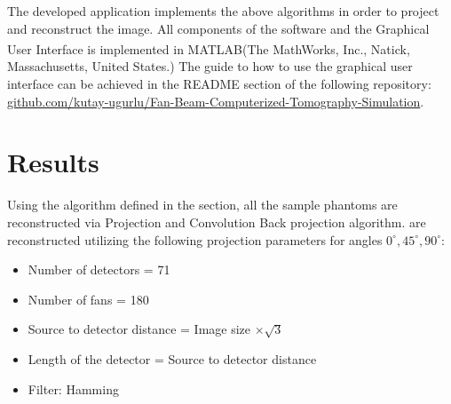 \documentclass[journal]{IEEEtran}
\begin{document}
The developed application implements the above algorithms in order to project and reconstruct the image. All components of the software and the Graphical User Interface is implemented in MATLAB(The MathWorks\textsuperscript{\textregistered}, Inc., Natick, Massachusetts, United States.) The guide to how to use the graphical user interface can be achieved in the README section of the following repository: \href{https://github.com/kutay-ugurlu/Fan-Beam-Computerized-Tomography-Simulation}{github.com/kutay-ugurlu/Fan-Beam-Computerized-Tomography-Simulation}.
\newpage
\section{Results}\label{sec:results}

Using the algorithm defined in the  section, all the sample phantoms are reconstructed via Projection and Convolution Back projection algorithm.  are reconstructed utilizing the following projection parameters for angles \(0^\circ, 45^\circ, 90^\circ\):
\begin{itemize}
	\item Number of detectors = 71
	\item Number of fans = 180
	\item Source to detector distance = Image size $\times \sqrt{3}$
	\item Length of the detector = Source to detector distance 
	\item Filter: Hamming
\end{itemize}
\end{document}
